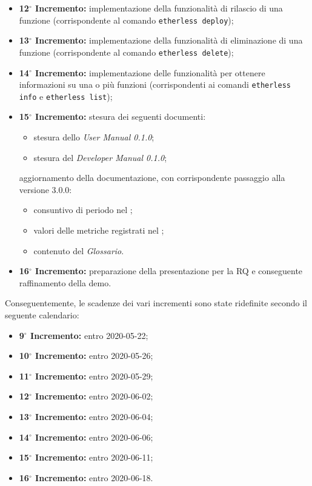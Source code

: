 \begin{itemize}
	\item \textbf{12$^{\circ}$ Incremento:} implementazione della funzionalità di rilascio di una funzione (corrispondente al comando \texttt{etherless deploy});
	\item \textbf{13$^{\circ}$ Incremento:} implementazione della funzionalità di eliminazione di una funzione (corrispondente al comando \texttt{etherless delete});
	\item \textbf{14$^{\circ}$ Incremento:} implementazione delle funzionalità per ottenere informazioni su una o più funzioni (corrispondenti ai comandi \texttt{etherless info} e \texttt{etherless list});
	\item \textbf{15$^{\circ}$ Incremento:} stesura dei seguenti documenti:
	\begin{itemize}
		\item stesura dello \textit{User Manual 0.1.0};
		\item stesura del \textit{Developer Manual 0.1.0};
	\end{itemize}
	aggiornamento della documentazione, con corrispondente passaggio alla versione 3.0.0:
	\begin{itemize}
		\item consuntivo di periodo nel \textit{\PdP{}};
		\item valori delle metriche registrati nel \textit{\PdQ{}};
		\item contenuto del \textit{Glossario}.
	\end{itemize}
	\item \textbf{16$^{\circ}$ Incremento:} preparazione della presentazione per la RQ e conseguente raffinamento della demo.
\end{itemize}

Conseguentemente, le scadenze dei vari incrementi sono state ridefinite secondo il seguente calendario:
\begin{itemize}
	\item \textbf{9$^{\circ}$ Incremento:} entro 2020-05-22;
	\item \textbf{10$^{\circ}$ Incremento:} entro 2020-05-26;
	\item \textbf{11$^{\circ}$ Incremento:} entro 2020-05-29;
	\item \textbf{12$^{\circ}$ Incremento:} entro 2020-06-02;
	\item \textbf{13$^{\circ}$ Incremento:} entro 2020-06-04;
	\item \textbf{14$^{\circ}$ Incremento:} entro 2020-06-06;
	\item \textbf{15$^{\circ}$ Incremento:} entro 2020-06-11;
	\item \textbf{16$^{\circ}$ Incremento:} entro 2020-06-18.
\end{itemize}

